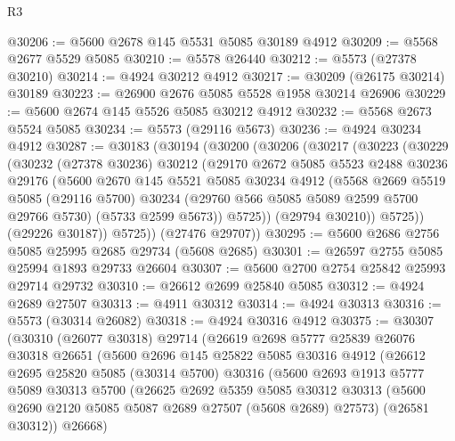 \begin{lexlean}{R3}
\begin{coremodule}
@30206 := @5600 @2678 @145 @5531 @5085 @30189 @4912
@30209 := @5568 @2677 @5529 @5085
@30210 := @5578 @26440
@30212 := @5573 (@27378 @30210)
@30214 := @4924 @30212 @4912
@30217 := @30209 (@26175 @30214) @30189
@30223 := @26900 @2676 @5085 @5528 @1958 @30214 @26906
@30229 := @5600 @2674 @145 @5526 @5085 @30212 @4912
@30232 := @5568 @2673 @5524 @5085
@30234 := @5573 (@29116 @5673)
@30236 := @4924 @30234 @4912
@30287 := @30183
    (@30194
      (@30200
        (@30206
          (@30217
            (@30223
              (@30229
                (@30232
                  (@27378 @30236)
                  @30212
                  (@29170
                    @2672
                    @5085
                    @5523
                    @2488
                    @30236
                    @29176
                    (@5600
                      @2670
                      @145
                      @5521
                      @5085
                      @30234
                      @4912
                      (@5568
                        @2669
                        @5519
                        @5085
                        (@29116 @5700)
                        @30234
                        (@29760 @566 @5085 @5089 @2599 @5700 @29766 @5730)
                        (@5733 @2599 @5673))
                      @5725))
                  (@29794 @30210))
                @5725))
            (@29226 @30187))
          @5725))
      (@27476 @29707))
@30295 := @5600 @2686 @2756 @5085 @25995 @2685 @29734 (@5608 @2685)
@30301 := @26597 @2755 @5085 @25994 @1893 @29733 @26604
@30307 := @5600 @2700 @2754 @25842 @25993 @29714 @29732
@30310 := @26612 @2699 @25840 @5085
@30312 := @4924 @2689 @27507
@30313 := @4911 @30312
@30314 := @4924 @30313
@30316 := @5573 (@30314 @26082)
@30318 := @4924 @30316 @4912
@30375 := @30307
    (@30310
      (@26077 @30318)
      @29714
      (@26619
        @2698
        @5777
        @25839
        @26076
        @30318
        @26651
        (@5600
          @2696
          @145
          @25822
          @5085
          @30316
          @4912
          (@26612
            @2695
            @25820
            @5085
            (@30314 @5700)
            @30316
            (@5600
              @2693
              @1913
              @5777
              @5089
              @30313
              @5700
              (@26625
                @2692
                @5359
                @5085
                @30312
                @30313
                (@5600 @2690 @2120 @5085 @5087 @2689 @27507 (@5608 @2689) @27573)
                (@26581 @30312))
              @26668)

\end{coremodule}
\end{lexlean}
